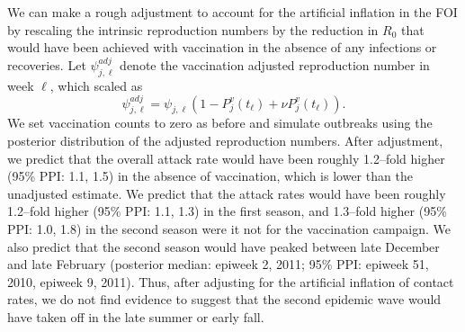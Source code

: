 We can make a rough adjustment to account for the artificial inflation in the FOI by rescaling the intrinsic reproduction numbers by the reduction in $ R_0 $ that would have been achieved with vaccination in the absence of any infections or recoveries. Let $ \psi_{j,\ell}^{adj} $ denote the vaccination adjusted reproduction number in week $ \ell $, which scaled as
\begin{equation}
\label{eqn:R0_adj}
\psi_{j,\ell}^{adj} = \psi_{j,\ell}\left (1 - P^v_j(t_\ell) + \nu P^v_j(t_\ell)\right ).\end{equation}
We set vaccination counts to zero as before and simulate outbreaks using the posterior distribution of the adjusted reproduction numbers. After adjustment, we predict that the overall attack rate would have been roughly 1.2--fold higher (95\% PPI: 1.1, 1.5) in the absence of vaccination, which is lower than the unadjusted estimate. We predict that the attack rates would have been roughly 1.2--fold higher (95\% PPI: 1.1, 1.3) in the first season, and 1.3--fold higher (95\% PPI: 1.0, 1.8) in the second season were it not for the vaccination campaign. We also predict that the second season would have peaked between late December and late February (posterior median: epiweek 2, 2011; 95\% PPI: epiweek 51, 2010, epiweek 9, 2011). Thus, after adjusting for the artificial inflation of contact rates, we do not find evidence to suggest that the second epidemic wave would have taken off in the late summer or early fall. 
 
